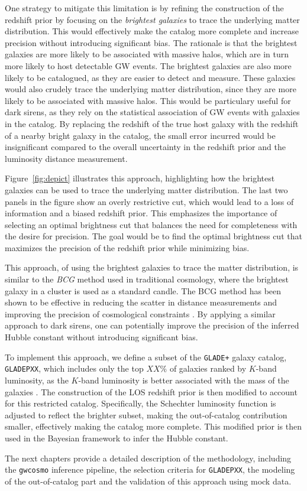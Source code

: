 One strategy to mitigate this limitation is by refining the construction of the redshift prior by focusing on the \textit{brightest galaxies} to trace the underlying matter distribution. This would effectively make the catalog more complete and increase precision without introducing significant bias. The rationale is that the brightest galaxies are more likely to be associated with massive halos, which are in turn more likely to host detectable \ac{GW} events. The brightest galaxies are also more likely to be catalogued, as they are easier to detect and measure. These galaxies would also crudely trace the underlying matter distribution, since they are more likely to be associated with massive halos. This would be particulary useful for dark sirens, as they rely on the statistical association of \ac{GW} events with galaxies in the catalog. By replacing the redshift of the true host galaxy with the redshift of a nearby bright galaxy in the catalog, the small error incurred would be insignificant compared to the overall uncertainty in the redshift prior and the luminosity distance measurement.

Figure~\ref{fig:depict} illustrates this approach, highlighting how the brightest galaxies can be used to trace the underlying matter distribution. The last two panels in the figure show an overly restrictive cut, which would lead to a loss of information and a biased redshift prior. This emphasizes the importance of selecting an optimal brightness cut that balances the need for completeness with the desire for precision. The goal would be to find the optimal brightness cut that maximizes the precision of the redshift prior while minimizing bias.

This approach, of using the brightest galaxies to trace the matter distribution, is similar to the \textit{\ac{BCG}} method used in traditional cosmology, where the brightest galaxy in a cluster is used as a standard candle. The \ac{BCG} method has been shown to be effective in reducing the scatter in distance measurements and improving the precision of cosmological constraints \citep{lauer2014brightest}. By applying a similar approach to dark sirens, one can potentially improve the precision of the inferred Hubble constant without introducing significant bias.

To implement this approach, we define a subset of the \texttt{GLADE+} galaxy catalog, \texttt{GLADEPXX}, which includes only the top $XX\%$ of galaxies ranked by $K$-band luminosity, as the $K$-band luminosity is better associated with the mass of the galaxies \citep{strazzullo2006near,sureshkumar2021galaxy}. The construction of the LOS redshift prior is then modified to account for this restricted catalog. Specifically, the Schechter luminosity function is adjusted to reflect the brighter subset, making the out-of-catalog contribution smaller, effectively making the catalog more complete. This modified prior is then used in the Bayesian framework to infer the Hubble constant.

The next chapters provide a detailed description of the methodology, including the \texttt{gwcosmo} inference pipeline, the selection criteria for \texttt{GLADEPXX}, the modeling of the out-of-catalog part and the validation of this approach using mock data.